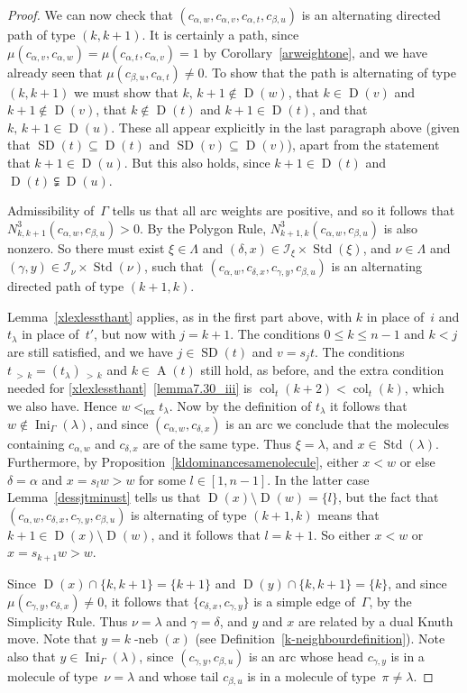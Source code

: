 \documentclass[10pt]{amsart}
\theoremstyle{definition}
\DeclareMathOperator{\Ini}{Ini}
\DeclareMathOperator{\lex}{lex}
\DeclareMathOperator{\col}{col}
\newcommand{\morethan}[2]{#1\,{_{>\,#2}}}
\DeclareMathOperator{\STD}{Std}
\DeclareMathOperator{\neb}{-neb}
\DeclareMathOperator{\SD}{SD}
\DeclareMathOperator{\D}{D}
\DeclareMathOperator{\A}{A}
\begin{document}
\begin{proof}
We can now check that $(c_{\alpha,w},c_{\alpha,v},c_{\alpha,t},c_{\beta,u})$ is
an alternating directed path of type $(k,k+1)$. It is certainly a path, since
$\mu(c_{\alpha,v},c_{\alpha,w})=\mu(c_{\alpha,t},c_{\alpha,v})=1$
by Corollary~\ref{arweightone}, and we have already seen that
$\mu(c_{\beta,u},c_{\alpha,t})\neq 0$. To show that the path is
alternating of type $(k,k+1)$ we must show that $k,\,k+1\notin \D(w)$,
that $k\in\D(v)$ and $k+1\notin\D(v)$, that $k\notin\D(t)$ and
$k+1\in\D(t)$, and that $k,\,k+1\in\D(u)$. These all appear explicitly
in the last paragraph above (given that $\SD(t)\subseteq\D(t)$ and
$\SD(v)\subseteq\D(v)$), apart from the statement that $k+1\in\D(u)$.
But this also holds, since $k+1\in\D(t)$ and $\D(t)\subsetneqq\D(u)$.

Admissibility of~$\Gamma$ tells us that all arc weights are positive,
and so it follows that $N^{3}_{k,k+1}(c_{\alpha,w},c_{\beta,u})>0$.
By the Polygon Rule, $N^{3}_{k+1,k}(c_{\alpha,w},c_{\beta,u})$ is also
nonzero. So there must exist $\xi\in\Lambda$ and
$(\delta,x)\in\mathcal{I}_{\xi}\times\STD(\xi)$, and
$\nu\in\Lambda$ and $(\gamma,y)\in\mathcal{I}_{\nu}\times\STD(\nu)$,
such that $(c_{\alpha,w}, c_{\delta,x}, c_{\gamma,y}, c_{\beta,u})$
is an alternating directed path of type $(k+1,k)$.

Lemma~\ref{xlexlessthant} applies, as in the first part above, with $k$
in place of~$i$ and $t_\lambda$ in place of~$t'$, but now with $j=k+1$.
The conditions $0\leqslant k\leqslant n-1$ and $k<j$ are still satisfied, and
we have $j\in\SD(t)$ and $v=s_jt$. The conditions
$\morethan {\morethan tk=(t_\lambda)}k$ and $k\in\A(t)$ still hold, as
before, and the extra condition needed for \ref{xlexlessthant}~\ref{lemma7.30_iii} is
$\col_t(k+2)<\col_t(k)$, which we also have. Hence $w<_{\lex}t_\lambda$.
Now by the definition of $t_\lambda$ it follows that
$w\notin\Ini_\Gamma(\lambda)$,
and since $(c_{\alpha,w}, c_{\delta,x})$ is an arc we conclude that
the molecules containing $c_{\alpha,w}$ and $c_{\delta,x}$ are of
the same type. Thus $\xi=\lambda$, and $x\in\STD(\lambda)$. Furthermore, by
Proposition~\ref{kldominancesamenolecule}, either $x<w$ or else
$\delta=\alpha$ and $x=s_lw>w$ for some $l\in[1,n-1]$. In the latter
case Lemma~\ref{dessjtminust} tells us that $\D(x)\setminus\D(w)=\{l\}$,
but the fact that $(c_{\alpha,w}, c_{\delta,x}, c_{\gamma,y}, c_{\beta,u})$ is
alternating of type $(k+1,k)$ means that $k+1\in\D(x)\setminus\D(w)$,
and it follows that $l=k+1$. So either $x<w$ or $x=s_{k+1}w>w$.

Since $\D(x)\cap\{k,k+1\}=\{k+1\}$ and $\D(y)\cap\{k,k+1\}=\{k\}$,
and since $\mu(c_{\gamma,y},c_{\delta,x})\neq 0$, it follows that
$\{c_{\delta,x},c_{\gamma,y}\}$ is a simple edge of~$\Gamma$, by
the Simplicity Rule. Thus $\nu=\lambda$ and $\gamma=\delta$, and
$y$ and $x$ are related by a dual Knuth move. Note that $y=k\neb(x)$
(see Definition~\ref{k-neighbourdefinition}). Note also that
$y\in\Ini_\Gamma(\lambda)$,
since $(c_{\gamma,y}, c_{\beta,u})$ is an arc whose head $c_{\gamma,y}$
is in a molecule of type~$\nu=\lambda$ and whose tail $c_{\beta,u}$
is in a molecule of type~$\pi\ne\lambda$.


\end{proof}
\end{document}
